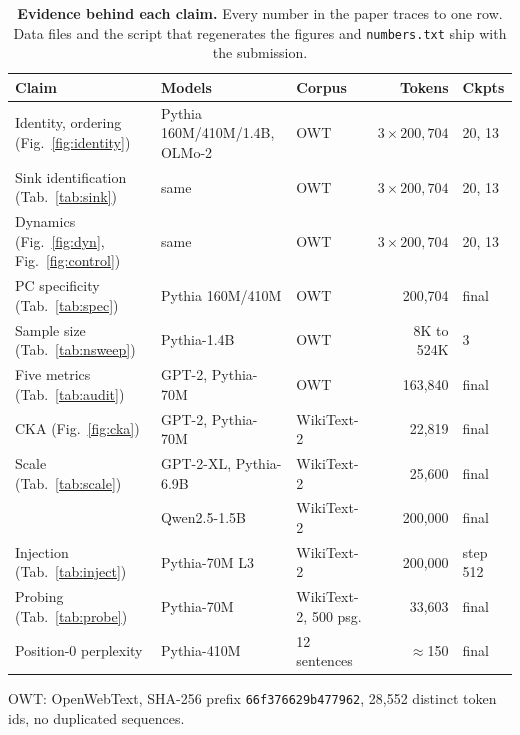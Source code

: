 \documentclass{article}
\theoremstyle{spaced}
\theoremstyle{definition}
\begin{document}
\begin{table}[t]
\centering
\caption{\textbf{Evidence behind each claim.} Every number in the paper traces to one row. Data files and the script that regenerates the figures and \texttt{numbers.txt} ship with the submission.}
\label{tab:scope}
\footnotesize
\begin{tabular}{@{}lllrl@{}}
\toprule
\textbf{Claim} & \textbf{Models} & \textbf{Corpus} & \textbf{Tokens} & \textbf{Ckpts} \\
\midrule
Identity, ordering (Fig.~\ref{fig:identity}) & Pythia 160M/410M/1.4B, OLMo-2 & OWT & $3 \times 200{,}704$ & 20, 13 \\
Sink identification (Tab.~\ref{tab:sink}) & same & OWT & $3 \times 200{,}704$ & 20, 13 \\
Dynamics (Fig.~\ref{fig:dyn}, Fig.~\ref{fig:control}) & same & OWT & $3 \times 200{,}704$ & 20, 13 \\
PC specificity (Tab.~\ref{tab:spec}) & Pythia 160M/410M & OWT & 200{,}704 & final \\
Sample size (Tab.~\ref{tab:nsweep}) & Pythia-1.4B & OWT & 8K to 524K & 3 \\
Five metrics (Tab.~\ref{tab:audit}) & GPT-2, Pythia-70M & OWT & 163{,}840 & final \\
CKA (Fig.~\ref{fig:cka}) & GPT-2, Pythia-70M & WikiText-2 & 22{,}819 & final \\
Scale (Tab.~\ref{tab:scale}) & GPT-2-XL, Pythia-6.9B & WikiText-2 & 25{,}600 & final \\
 & Qwen2.5-1.5B & WikiText-2 & 200{,}000 & final \\
Injection (Tab.~\ref{tab:inject}) & Pythia-70M L3 & WikiText-2 & 200{,}000 & step 512 \\
Probing (Tab.~\ref{tab:probe}) & Pythia-70M & WikiText-2, 500 psg. & 33{,}603 & final \\
Position-0 perplexity & Pythia-410M & 12 sentences & $\approx$150 & final \\
\bottomrule
\end{tabular}
\vspace{2pt}

\raggedright\footnotesize OWT: OpenWebText, SHA-256 prefix \texttt{66f376629b477962}, 28{,}552 distinct token ids, no duplicated sequences.
\end{table}
\end{document}
